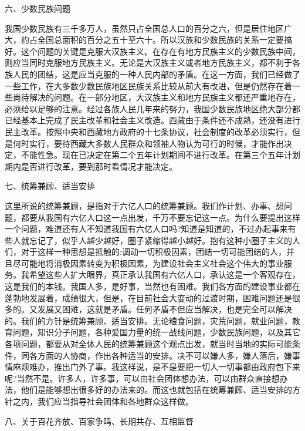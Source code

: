 \documentclass[UTF8, 12pt, a4paper]{ctexrep}
\begin{document}
六、少数民族问题

我国少数民族有三千多万人，虽然只占全国总人口的百分之六，但是居住地区广大，约占全国总面积的百分之五十至六十。所以汉族和少数民族的关系一定要搞好。这个问题的关键是克服大汉族主义。在存在有地方民族主义的少数民族中间，则应当同时克服地方民族主义。无论是大汉族主义或者地方民族主义，都不利于各族人民的团结，这是应当克服的一种人民内部的矛盾。在这一方面，我们已经做了一些工作，在大多数少数民族地区民族关系比较从前大有改进，但是仍然存在着一些尚待解决的问题。在一部分地区，大汉族主义和地方民族主义都还严重地存在，必须给以足够的注意。经过各族人民几年来的努力，我国少数民族地区绝大部分都已经基本上完成了民主改革和社会主义改造。西藏由于条件还不成熟，还没有进行民主改革。按照中央和西藏地方政府的十七条协议，社会制度的改革必须实行，但是何时实行，要待西藏大多数人民群众和领袖人物认为可行的时候，才能作出决定，不能性急。现在已决定在第二个五年计划期间不进行改革。在第三个五年计划期内是否进行改革，要到那时看情况才能决定。

七、统筹兼顾、适当安排

这里所说的统筹兼顾，是指对于六亿人口的统筹兼顾。我们作计划、办事、想问题，都要从我国有六亿人口这一点出发，千万不要忘记这一点。为什么要提出这样一个问题，难道还有人不知道我国有六亿人口吗?知道是知道的，不过办起事来有些人就忘记了，似乎人越少越好，圈子紧缩得越小越好。抱有这种小圈子主义的人们，对于这样一种思想是抵触的:调动一切积极因素，团结一切可能团结的人，并且尽可能地将消极因素转变为积极因素，为建设社会主义社会这个伟大的事业服务。我希望这些人扩大眼界，真正承认我国有六亿人口，承认这是一个客观存在，这是我们的本钱。我国人多，是好事，当然也有困难。我们各方面的建设事业都在蓬勃地发展着，成绩很大，但是，在目前社会大变动的过渡时期，困难问题还是很多的。又发展又困难，这就是矛盾。任何矛盾不但应当解决，也是完全可以解决的。我们的方针是统筹兼顾、适当安排。无论粮食问题，灾荒问题，就业问题，教育问题，知识分子问题，各种爱国力量的统一战线问题，少数民族问题，以及其它各项问题，都要从对全体人民的统筹兼顾这个观点出发，就当时当地的实际可能条件，同各方面的人协商，作出各种适当的安排。决不可以嫌人多，嫌人落后，嫌事情麻烦难办，推出门外了事。我这样说，是不是要把一切人一切事都由政府包下来呢?当然不是。许多人，许多事，可以由社会团体想办法，可以由群众直接想办法，他们是能够想出很多好的办法来的。而这也就包括在统筹兼顾、适当安排的方针之内，我们应当指导社会团体和各地群众这样做。

八、关于百花齐放、百家争鸣、长期共存、互相监督
\end{document}
